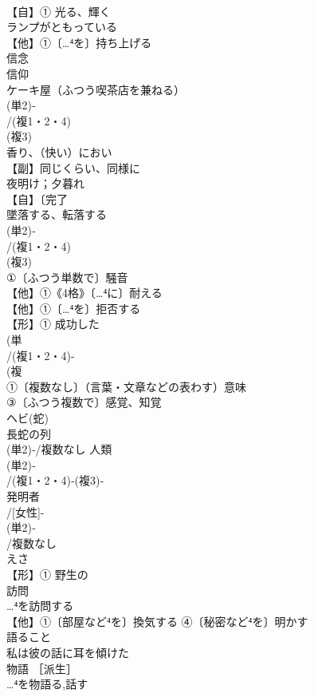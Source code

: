 \documentclass[8pt]{extreport}
\begin{document}
\begin{CJK}{UTF8}{min}
\\	【自】① 光る、輝く 
\\	ランプがともっている
\\	【他】①〔…⁴を〕持ち上げる
\\	信念
\\	信仰
\\	ケーキ屋（ふつう喫茶店を兼ねる）
\\	(単2)‐
\\	/(複1・2・4)
\\	(複3)
\\	香り、（快い）におい
\\	【副】同じくらい、同様に
\\	夜明け；夕暮れ
\\	【自】〔完了
\\	墜落する、転落する
\\	(単2)‐
\\	/(複1・2・4)
\\	(複3)
\\	①〔ふつう単数で〕騒音
\\	【他】①《4格》〔…⁴に〕耐える 
\\	【他】①〔…⁴を〕拒否する 
\\	【形】① 成功した 
\\	(単
\\	/(複1・2・4)-
\\	(複
\\	①〔複数なし〕（言葉・文章などの表わす）意味 
\\	③〔ふつう複数で〕感覚、知覚
\\	ヘビ(蛇) 
\\	長蛇の列
\\	(単2)‐/複数なし 人類 
\\	(単2)‐
\\	/(複1・2・4)‐(複3)‐
\\	発明者
\\	/[女性]-
\\	(単2)‐
\\	/複数なし　
\\	えさ
\\	【形】① 野生の 
\\	訪問 
\\	…⁴を訪問する
\\	【他】①〔部屋など⁴を〕換気する ④〔秘密など⁴を〕明かす
\\	[物]語ること
\\	私は彼の話に耳を傾けた 
\\	物語 ［派生］ 
\\	…⁴を物語る,話す

\end{CJK}
\end{document}

